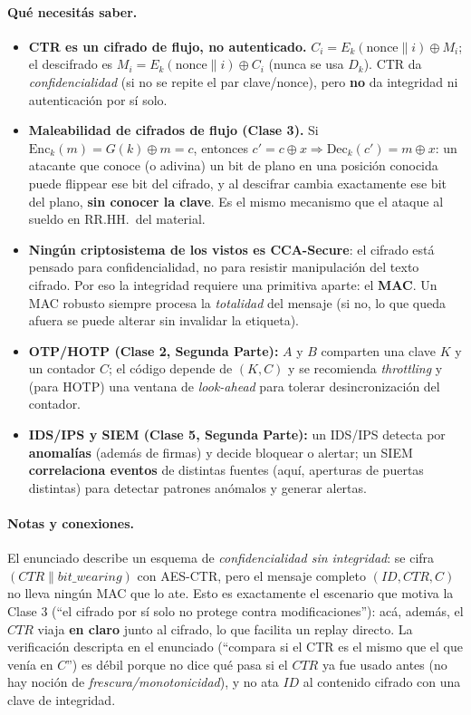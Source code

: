 \paragraph{Qué necesitás saber.}
\begin{itemize}
  \item \textbf{CTR es un cifrado de flujo, no autenticado.} $C_i = E_k(\text{nonce}
  \|i)\oplus M_i$; el descifrado es $M_i = E_k(\text{nonce}\|i)\oplus C_i$ (nunca se
  usa $D_k$). CTR da \emph{confidencialidad} (si no se repite el par clave/nonce),
  pero \textbf{no} da integridad ni autenticación por sí solo.
  \item \textbf{Maleabilidad de cifrados de flujo (Clase 3).} Si
  $\mathrm{Enc}_k(m) = G(k)\oplus m = c$, entonces $c' = c\oplus x \Rightarrow
  \mathrm{Dec}_k(c') = m\oplus x$: un atacante que conoce (o adivina) un bit de
  plano en una posición conocida puede flippear ese bit del cifrado, y al descifrar
  cambia exactamente ese bit del plano, \textbf{sin conocer la clave}. Es el mismo
  mecanismo que el ataque al sueldo en RR.HH.\ del material.
  \item \textbf{Ningún criptosistema de los vistos es CCA-Secure}: el cifrado está
  pensado para confidencialidad, no para resistir manipulación del texto cifrado.
  Por eso la integridad requiere una primitiva aparte: el \textbf{MAC}. Un MAC
  robusto siempre procesa la \emph{totalidad} del mensaje (si no, lo que queda
  afuera se puede alterar sin invalidar la etiqueta).
  \item \textbf{OTP/HOTP (Clase 2, Segunda Parte):} $A$ y $B$ comparten una clave
  $K$ y un contador $C$; el código depende de $(K,C)$ y se recomienda
  \emph{throttling} y (para HOTP) una ventana de \emph{look-ahead} para tolerar
  desincronización del contador.
  \item \textbf{IDS/IPS y SIEM (Clase 5, Segunda Parte):} un IDS/IPS detecta por
  \textbf{anomalías} (además de firmas) y decide bloquear o alertar; un SIEM
  \textbf{correlaciona eventos} de distintas fuentes (aquí, aperturas de puertas
  distintas) para detectar patrones anómalos y generar alertas.
\end{itemize}

\paragraph{Notas y conexiones.}
El enunciado describe un esquema de \emph{confidencialidad sin integridad}: se cifra
$(CTR\|\mathit{bit\_wearing})$ con AES-CTR, pero el mensaje completo $(ID,CTR,C)$ no
lleva ningún MAC que lo ate. Esto es exactamente el escenario que motiva la Clase 3
(``el cifrado por sí solo no protege contra modificaciones''): acá, además, el
$CTR$ viaja \textbf{en claro} junto al cifrado, lo que facilita un replay directo. La
verificación descripta en el enunciado (``compara si el CTR es el mismo que el que
venía en $C$'') es débil porque no dice qué pasa si el $CTR$ ya fue usado antes
(no hay noción de \emph{frescura/monotonicidad}), y no ata $ID$ al contenido cifrado
con una clave de integridad.

